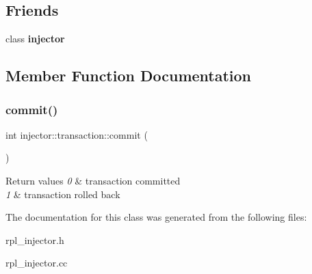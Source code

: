 \subsection*{Friends}
\begin{DoxyCompactItemize}
\item 
\mbox{\label{classinjector_1_1transaction_ad27499ba8668ef66ebec662c7b552419}} 
class {\bfseries injector}
\end{DoxyCompactItemize}


\subsection{Member Function Documentation}
\mbox{\label{classinjector_1_1transaction_a83b7faf4da3c9450ea2feed25565a308}} 
\subsubsection{\texorpdfstring{commit()}{commit()}}
{\footnotesize\ttfamily int injector\+::transaction\+::commit (\begin{DoxyParamCaption}{ }\end{DoxyParamCaption})}


\begin{DoxyRetVals}{Return values}
{\em 0} & transaction committed \\
\hline
{\em 1} & transaction rolled back \\
\hline
\end{DoxyRetVals}


The documentation for this class was generated from the following files\+:\begin{DoxyCompactItemize}
\item 
rpl\+\_\+injector.\+h\item 
rpl\+\_\+injector.\+cc\end{DoxyCompactItemize}
